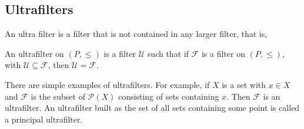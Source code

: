 \documentclass{owmaths}
\begin{document}
\subsection{Ultrafilters}
An ultra filter is a filter that is not contained in any larger
filter, that is,
\begin{definition}
    An ultrafilter on $(P,\leq)$ is a filter $\mathcal{U}$
    such that if $\mathcal{F}$ is a filter on $(P,\leq)$, 
    with $\mathcal{U} \subseteq \mathcal{F}$, then $\mathcal{U} = \mathcal{F}$.
\end{definition}

There are simple examples of ultrafilters. For example, if $X$
is a set with $x \in X$ and $\mathcal{F}$ is the subset of $\mathcal{P}(X)$
consisting of sets containing $x$. Then $\mathcal{F}$ is an ultrafilter.
An ultrafilter built as the set of all sets containing some point is called
a principal ultrafilter.
\end{document}
